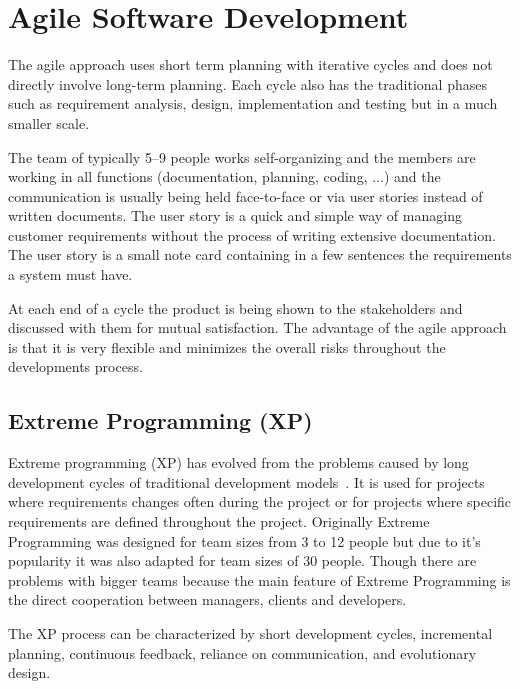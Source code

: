 

\section{Agile Software Development} %
\label{sec:agile_software_development_methodologies}

The agile approach uses short term planning with iterative cycles and
does not directly involve long-term planning. Each cycle also has the
traditional phases such as requirement analysis, design, implementation and
testing but in a much smaller scale.

The team of typically 5--9 people works self-organizing and the members are
working in all functions (documentation, planning, coding, $\dots$) and the
communication is usually being held face-to-face or via user stories instead
of written documents. The user story is a quick and simple way of managing
customer requirements without the process of writing extensive documentation. The
user story is a small note card containing in a few sentences the requirements
a system must have.

At each end of a cycle the product is being shown to the stakeholders and
discussed with them for mutual satisfaction. The advantage of the agile
approach is that it is very flexible and minimizes the overall risks throughout
the developments process.



\subsection{Extreme Programming (XP)} 

Extreme programming (XP) has evolved from the problems caused by long
development cycles of traditional development models~\cite{four}. It is used for
projects where requirements changes often during the project or for projects
where specific requirements are defined throughout the project. Originally
Extreme Programming was designed for team sizes from 3 to 12 people but due to
it's popularity it was also adapted for team sizes of 30 people. Though there
are problems with bigger teams because the main feature of Extreme Programming
is the direct cooperation between managers, clients and developers.~\cite{two}

The XP process can be characterized by short development cycles, incremental
planning, continuous feedback, reliance on communication, and evolutionary
design.~\cite{three}

